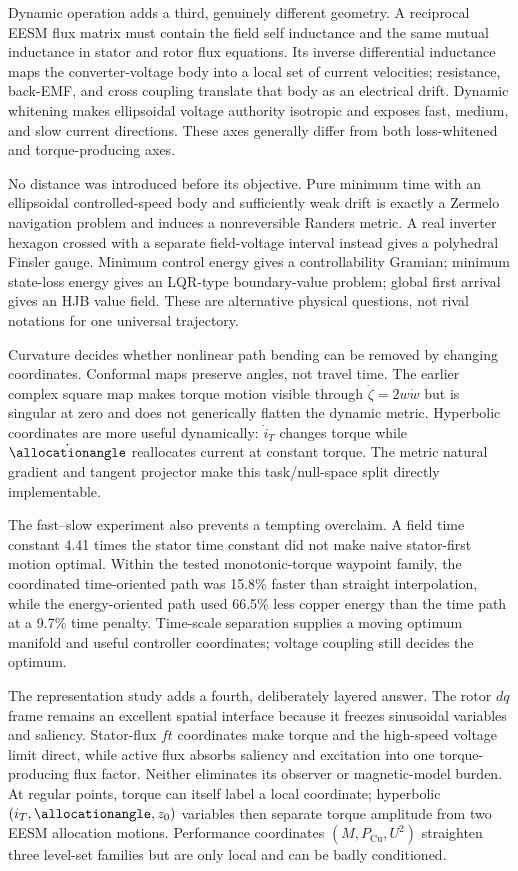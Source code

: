 Dynamic operation adds a third, genuinely different geometry. A reciprocal
EESM flux matrix must contain the field self inductance and the same mutual
inductance in stator and rotor flux equations. Its inverse differential
inductance maps the converter-voltage body into a local set of current
velocities; resistance, back-EMF, and cross coupling translate that body as an
electrical drift. Dynamic whitening makes ellipsoidal voltage authority
isotropic and exposes fast, medium, and slow current directions. These axes
generally differ from both loss-whitened and torque-producing axes.

No distance was introduced before its objective. Pure minimum time with an
ellipsoidal controlled-speed body and sufficiently weak drift is exactly a
Zermelo navigation problem and induces a nonreversible Randers metric. A real
inverter hexagon crossed with a separate field-voltage interval instead gives
a polyhedral Finsler gauge. Minimum control energy gives a controllability
Gramian; minimum state-loss energy gives an LQR-type boundary-value problem;
global first arrival gives an HJB value field. These are alternative physical
questions, not rival notations for one universal trajectory.

Curvature decides whether nonlinear path bending can be removed by changing
coordinates. Conformal maps preserve angles, not travel time. The earlier
complex square map makes torque motion visible through
\(\dot\zeta=2w\dot w\) but is singular at zero and does not generically flatten
the dynamic metric. Hyperbolic coordinates are more useful dynamically:
\(\dot i_T\) changes torque while \(\dot{\allocationangle}\) reallocates current at
constant torque. The metric natural gradient and tangent projector make this
task/null-space split directly implementable.

The fast--slow experiment also prevents a tempting overclaim. A field time
constant 4.41 times the stator time constant did not make naive stator-first
motion optimal. Within the tested monotonic-torque waypoint family, the
coordinated time-oriented path was 15.8\% faster than straight interpolation,
while the energy-oriented path used 66.5\% less copper energy than the time
path at a 9.7\% time penalty. Time-scale separation supplies a moving optimum
manifold and useful controller coordinates; voltage coupling still decides
the optimum.

The representation study adds a fourth, deliberately layered answer. The
rotor \(dq\) frame remains an excellent spatial interface because it freezes
sinusoidal variables and saliency. Stator-flux \(ft\) coordinates make torque
and the high-speed voltage limit direct, while active flux absorbs saliency
and excitation into one torque-producing flux factor. Neither eliminates its
observer or magnetic-model burden. At regular points, torque can itself label
a local coordinate; hyperbolic \((i_T,\allocationangle,z_0)\) variables then separate
torque amplitude from two EESM allocation motions. Performance coordinates
\((M,P_{\mathrm{Cu}},U^2)\) straighten three level-set families but are only
local and can be badly conditioned.

